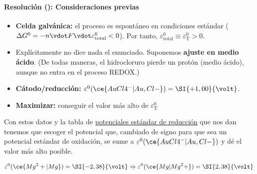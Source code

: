 \begin{frame}
	\frametitle{\ejerciciocmd}
	\framesubtitle{Resolución (): Consideraciones previas}
	\begin{itemize}
		\item\textbf{Celda galvánica:} el proceso es espontáneo en condiciones estándar ($\Delta G^0 = - n\vdot F\vdot\varepsilon^0_{\text{total}} < 0$). Por tanto, $\varepsilon^0_{\text{total}}\equiv\varepsilon^0_{\text{T}} > 0$.
		\item Explícitamente no dice nada el enunciado. Suponemos \textbf{ajuste en medio ácido}. {\small (De todas maneras, el hidrocloruro pierde un protón (medio ácido), aunque no entra en el proceso REDOX.)}
		\item\textbf{Cátodo/reducción:} $\varepsilon^0(\ce{AuCl4^-|Au,Cl-}) = \SI{+1,00}{\volt}$.
		\item\textbf{Maximizar:} conseguir el valor más alto de $\varepsilon^0_\text{T}$
	\end{itemize}
	Con estos datos y la tabla de \underline{potenciales estándar de reducción} que nos dan tenemos que escoger el potencial que, cambiado de signo para que sea un potencial estándar de oxidación, se sume a $\varepsilon^0(\ce{AuCl4^-|Au,Cl-})$ y dé el valor más alto posible.
	
	$$
		\varepsilon^0(\ce{Mg^2+|Mg}) = \SI{-2,38}{\volt}\Rightarrow\varepsilon^0(\ce{Mg|Mg^2+}) = \SI{2,38}{\volt}
	$$
\end{frame}

